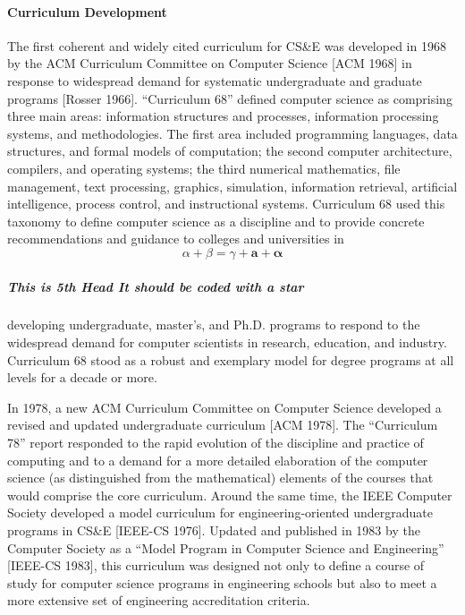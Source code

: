 \paragraph{Curriculum Development}%
\noindent
The first coherent and widely cited curriculum for CS\&E was
developed in 1968 by the ACM Curriculum Committee on Computer
Science [ACM 1968]  in response to widespread demand for
systematic undergraduate and graduate programs [Rosser 1966].
``Curriculum 68'' defined computer science as comprising three
main areas: information structures and processes, information
processing systems, and methodologies. The first area included
programming languages, data structures, and formal models of
computation; the second computer architecture, compilers, and
operating systems; the third numerical mathematics, file
management, text processing, graphics, simulation, information
retrieval, artificial intelligence, process control, and
instructional systems. Curriculum 68 used this taxonomy to
define computer science as a discipline and to provide concrete
recommendations and guidance to colleges and universities in
\begin{equation}
\alpha+\beta=\gamma+\bm{a}+\bm{\alpha}
\end{equation}

\subparagraph*{This is 5th Head It should be coded with a star}%
developing undergraduate, master's, and Ph.D. programs to
respond to the widespread demand for computer scientists in
research, education, and industry. Curriculum 68 stood as a
robust and exemplary model for degree programs at all levels
for a decade or more.

In 1978, a new ACM Curriculum Committee on Computer Science
developed a revised and updated undergraduate curriculum [ACM
1978]. The ``Curriculum 78'' report responded to the rapid
evolution of the discipline and practice of computing and to a
demand for a more detailed elaboration of the computer science
(as distinguished from the mathematical) elements of the courses
that would comprise the core curriculum. Around the same time,
the IEEE Computer Society developed a model curriculum for
engineering-oriented undergraduate programs in CS\&E [IEEE-CS
1976]. Updated and published in 1983 by the Computer Society as
a ``Model Program in Computer Science and Engineering'' [IEEE-CS
1983], this curriculum was designed not only to define a course
of study for computer science programs in engineering schools
but also to meet a more extensive set of engineering accreditation criteria.

